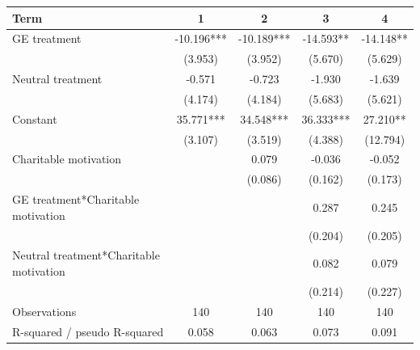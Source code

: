 \begin{tabular}{lcccc}
\hline
Term & 1 & 2 & 3 & 4 \\
\hline
GE treatment & -10.196*** & -10.189*** & -14.593** & -14.148** \\
 & (3.953) & (3.952) & (5.670) & (5.629) \\
Neutral treatment & -0.571 & -0.723 & -1.930 & -1.639 \\
 & (4.174) & (4.184) & (5.683) & (5.621) \\
Constant & 35.771*** & 34.548*** & 36.333*** & 27.210** \\
 & (3.107) & (3.519) & (4.388) & (12.794) \\
Charitable motivation &  & 0.079 & -0.036 & -0.052 \\
 &  & (0.086) & (0.162) & (0.173) \\
GE treatment*Charitable motivation &  &  & 0.287 & 0.245 \\
 &  &  & (0.204) & (0.205) \\
Neutral treatment*Charitable motivation &  &  & 0.082 & 0.079 \\
 &  &  & (0.214) & (0.227) \\
Observations & 140 & 140 & 140 & 140 \\
R-squared / pseudo R-squared & 0.058 & 0.063 & 0.073 & 0.091 \\
\hline
\end{tabular}
